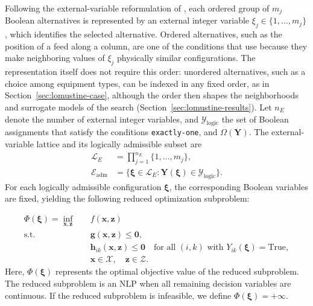 \documentclass{article}
\begin{document}
Following the external-variable reformulation of \citet{ovalle2025logic}, each ordered group of \(m_j\) Boolean alternatives is represented by an external integer variable \(\xi_j\in\{1,\ldots,m_j\}\), which identifies the selected alternative.
Ordered alternatives, such as the position of a feed along a column, are one of the conditions that \citet{ovalle2025logic} use because they make neighboring values of \(\xi_j\) physically similar configurations.
The representation itself does not require this order: unordered alternatives, such as a choice among equipment types, can be indexed in any fixed order, as in Section~\ref{sec:lomustine-case}, although the order then shapes the neighborhoods and surrogate models of the search (Section~\ref{sec:lomustine-results}).
Let \(n_E\) denote the number of external integer variables, and \(\mathcal Y_{\mathrm{logic}}\) the set of Boolean assignments that satisfy the conditions \texttt{exactly-one}, and \(\Omega(\mathbf Y)\).
The external-variable lattice and its logically admissible subset are
\begin{equation}\label{eqn:external.lattice}
\begin{aligned}
\mathcal L_E&=\prod_{j=1}^{n_E}\{1,\ldots,m_j\},\\
\mathcal E_{\mathrm{adm}}&=\{\boldsymbol\xi\in\mathcal L_E:
\mathbf Y(\boldsymbol\xi)\in\mathcal Y_{\mathrm{logic}}\}.
\end{aligned}
\end{equation}
For each logically admissible configuration \(\boldsymbol\xi\), the corresponding Boolean variables are fixed, yielding the following reduced optimization subproblem:

\begin{equation}\label{eqn:Sub}
\begin{aligned}
\Phi(\boldsymbol\xi)=\inf_{\mathbf x,\mathbf z}\quad &f(\mathbf x,\mathbf z)\\
\text{s.t.}\quad &\mathbf g(\mathbf x,\mathbf z)\leq\mathbf 0,\\
&\mathbf h_{ik}(\mathbf x,\mathbf z)\leq\mathbf 0
\quad\text{for all }(i,k)\text{ with }Y_{ik}(\boldsymbol\xi)=\mathrm{True},\\
&\mathbf x\in\mathcal X,\quad\mathbf z\in\mathcal Z.
\end{aligned}\tag{Sub}
\end{equation}
Here, \(\Phi(\boldsymbol\xi)\) represents the optimal objective value of the reduced subproblem.
The reduced subproblem is an NLP when all remaining decision variables are continuous.
If the reduced subproblem is infeasible, we define \(\Phi(\boldsymbol\xi)=+\infty\).
\end{document}
